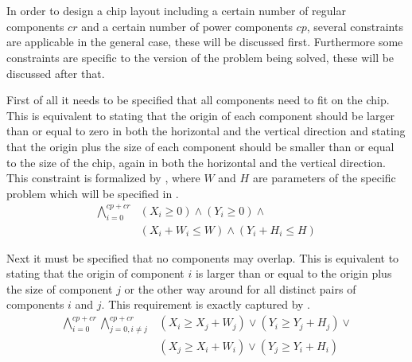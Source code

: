 \chapter{}\label{chp:2}
In order to design a chip layout including a certain number of regular components $cr$ and a certain number of power components $cp$, several constraints are applicable in the general case, these will be discussed first. Furthermore some constraints are specific to the version of the problem being solved, these will be discussed after that.

First of all it needs to be specified that all components need to fit on the chip. This is equivalent to stating that the origin of each component should be larger than or equal to zero in both the horizontal and the vertical direction and stating that the origin plus the size of each component should be smaller than or equal to the size of the chip, again in both the horizontal and the vertical direction. This constraint is formalized by , where $W$ and $H$ are parameters of the specific problem which will be specified in .
\begin{equation}
  \label{eqn:2_allfit}
  \begin{aligned}
    \bigwedge_{i = 0}^{cp + cr}
      &(X_{i} \geq 0) \wedge
       (Y_{i} \geq 0) \wedge \\
      &(X_{i} + W_{i} \leq W) \wedge
       (Y_{i} + H_{i} \leq H)
     \end{aligned}
\end{equation}

Next it must be specified that no components may overlap. This is equivalent to stating that the origin of component $i$ is larger than or equal to the origin plus the size of component $j$ or the other way around for all distinct pairs of components $i$ and $j$. This requirement is exactly captured by .
\begin{equation}
  \label{eqn:2_overlap}
  \begin{aligned}
    \bigwedge_{i = 0}^{cp + cr}
      \bigwedge_{j = 0, i \neq j}^{cp + cr}
        &(X_{i} \geq X_{j} + W_{j}) \vee
         (Y_{i} \geq Y_{j} + H_{j}) \vee \\
        &(X_{j} \geq X_{i} + W_{i}) \vee
         (Y_{j} \geq Y_{i} + H_{i})
  \end{aligned}
\end{equation}

